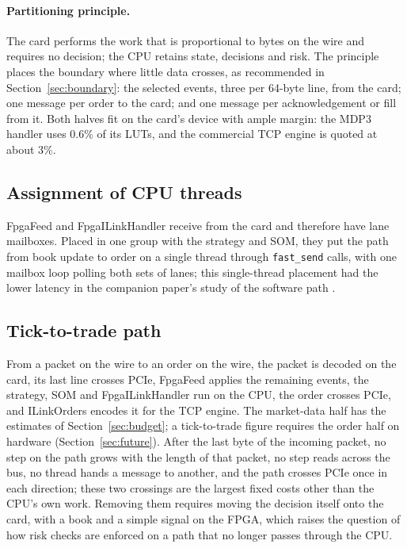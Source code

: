\documentclass[11pt]{article}
\newcommand{\fs}{\texttt{fast\_send}}
\begin{document}
\paragraph{Partitioning principle.} The card performs the work that is
proportional to bytes on the wire and requires no decision; the CPU retains
state, decisions and risk. The principle places the boundary where little data
crosses, as recommended in Section~\ref{sec:boundary}: the selected events,
three per 64-byte line, from the card; one message per order to the card; and
one message per acknowledgement or fill from it. Both halves fit on the card's
device with ample margin: the MDP3 handler uses 0.6\% of its LUTs, and the
commercial TCP engine is quoted at about 3\%.

\subsection{Assignment of CPU threads}

FpgaFeed and FpgaILinkHandler receive from the card and therefore have lane
mailboxes. Placed in one group with the strategy and SOM, they put the path
from book update to order on a single thread through \fs{} calls, with one
mailbox loop polling both sets of lanes; this single-thread placement had the
lower latency in the companion paper's study of the software path
\cite{fastsend}.

\subsection{Tick-to-trade path}

From a packet on the wire to an order on the wire, the packet is decoded on
the card, its last line crosses PCIe, FpgaFeed applies the remaining events,
the strategy, SOM and FpgaILinkHandler run on the CPU, the order crosses PCIe,
and ILinkOrders encodes it for the TCP engine. The market-data half has the
estimates of Section~\ref{sec:budget}; a tick-to-trade figure requires the
order half on hardware (Section~\ref{sec:future}). After the last byte of the
incoming packet, no step on the path grows with the length of that packet, no
step reads across the bus, no thread hands a message to another, and the path
crosses PCIe once in each direction; these two crossings are the largest fixed
costs other than the CPU's own work. Removing them
requires moving the decision itself onto the card, with a book and a simple
signal on the FPGA, which raises the question of how risk checks are enforced
on a path that no longer passes through the CPU.
\end{document}

